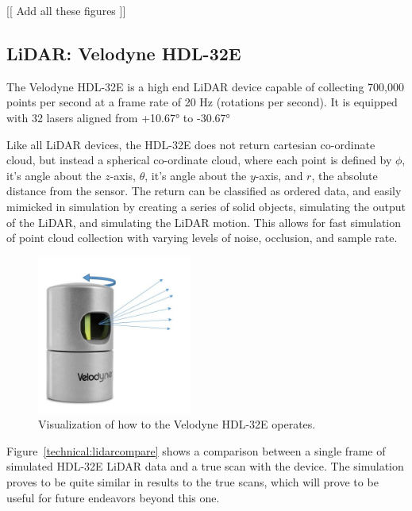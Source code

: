 \documentclass[12pt]{drexelthesis}
\let\Oldsubsection\subsection
\renewcommand{\subsection}{\FloatBarrier\Oldsubsection}
\begin{document}
[[ Add all these figures ]]




\subsection{LiDAR: Velodyne HDL-32E}
The Velodyne HDL-32E is a high end LiDAR device capable of collecting 700,000 points per second at a frame rate of 20 Hz (rotations per second). It is equipped with 32 lasers aligned from +\ang{10.67} to -\ang{30.67}

Like all LiDAR devices, the HDL-32E does not return cartesian co-ordinate cloud, but instead a spherical co-ordinate cloud, where each point is defined by $\phi$, it's angle about the $z$-axis, $\theta$, it's angle about the $y$-axis, and $r$, the absolute distance from the sensor. The return can be classified as ordered data, and easily mimicked in simulation by creating a series of solid objects, simulating the output of the LiDAR, and simulating the LiDAR motion. This allows for fast simulation of point cloud collection with varying levels of noise, occlusion, and sample rate.

\begin{figure}[!ht]
	\centering
		\includegraphics[width=2in]{cloudCollection/velodyneLiDAR.jpg}
		\caption[Velodyne LiDAR Operation]{Visualization of how to the Velodyne HDL-32E operates.}
\end{figure}

Figure~\ref{technical:lidarcompare} shows a comparison between a single frame of simulated HDL-32E LiDAR data and a true scan with the device. The simulation proves to be quite similar in results to the true scans, which will prove to be useful for future endeavors beyond this one.
\end{document}
